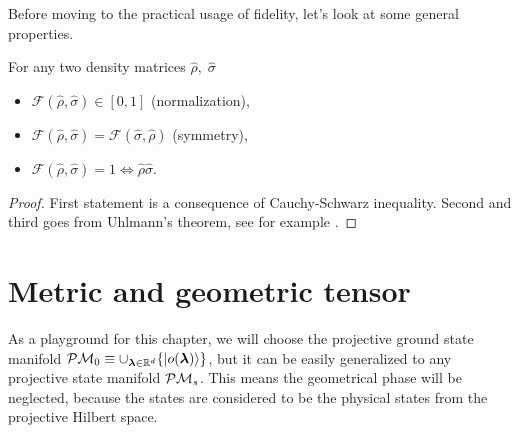 Before moving to the practical usage of fidelity, let's look at some general properties.
    

\begin{thm}
    For any two density matrices $\hat\rho,\;\hat\sigma$
    \begin{itemize}
        \item $\mathcal F(\hat\rho,\hat\sigma)\in[0,1]$ (normalization),
        \item $\mathcal F(\hat\rho,\hat\sigma) = \mathcal F(\hat\sigma,\hat\rho)$ (symmetry),
        \item $\mathcal F(\hat\rho,\hat\sigma)=1 \Leftrightarrow \hat\rho\hat\sigma$.
    \end{itemize}
\end{thm}
\begin{proof}
    First statement is a consequence of Cauchy-Schwarz inequality. Second and third goes from Uhlmann's theorem, see for example \cite{uhlman}.
\end{proof}



\section{Metric and geometric tensor}
\label{chap:metricTensor}
As a playground for this chapter, we will choose the projective ground state manifold $\mathcal{P}\mathcal{M}_0\equiv \cup_{{\bm\lambda}\in\mathbb{R}^d} \{\ket{o({\bm\lambda})}\}$, but it can be easily generalized to any projective state manifold $\mathcal{P}\mathcal{M}_s$. This means the geometrical phase will be neglected, because the states are considered to be the physical states from the projective Hilbert space.

